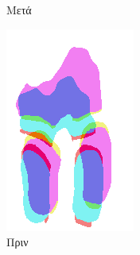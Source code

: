 \documentclass{beamer}
\begin{document}
\begin{frame}
\begin{figure}[H]
\begin{subfigure}[t]{0.24\linewidth}
    \caption{Μετά}
    \end{subfigure}
    \begin{subfigure}[t]{0.24\linewidth}
    \includegraphics[width=\linewidth]{combination_label_before_registration_2.png}
    \caption{Πριν}
    \end{subfigure}
    \begin{subfigure}[t]{0.24\linewidth}

\end{subfigure}
\end{figure}
\end{frame}
\end{document}
